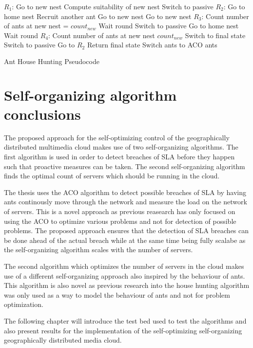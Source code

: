 \begin{algorithm}
\begin{algorithmic}
	\State $R_{1}$: Go to new nest
	\State Compute suitability of new nest
		Switch to passive
	\EndIf
	\State $R_{2}$: Go to home nest
		\State Recruit another ant
		\State Go to new nest
		\State Go to new nest
	\EndIf
	\State $R_{3}$: Count number of ants at new nest = $count_{new}$
		\State Wait round
		\State Switch to passive
		\State Go to home nest
		\State Wait round
	\EndIf
	\State $R_{4}$: Count number of ants at new nest $count_{new}$
		\State Switch to final state
		\State Switch to passive
		\State Go to $R_{2}$
	\EndIf
	\State Return final state
	\State Switch ants to ACO ants
\end{algorithmic}
\caption{Ant House Hunting Pseudocode}\label{ant:pseudocodeHouseHunting}
\end{algorithm}

\section{Self-organizing algorithm conclusions}

The proposed approach for the self-optimizing control of the geographically distributed multimedia cloud makes use of two self-organizing algorithms. The first algorithm is used in order to detect breaches of SLA before they happen such that proactive measures can be taken. The second self-organizing algorithm finds the optimal count of servers which should be running in the cloud.

The thesis uses the ACO algorithm to detect possible breaches of SLA by having ants continously move through the network and measure the load on the network of servers. This is a novel approach as previous reasearch has only focused on using the ACO to optimize various problems and not for detection of possible problems. The proposed approach ensures that the detection of SLA breaches can be done ahead of the actual breach while at the same time being fully scalabe as the self-organizing algorithm scales with the number of servers.

The second algorithm which optimizes the number of servers in the cloud makes use of a different self-organizing approach also inspired by the behaviour of ants. This algorithm is also novel as previous research into the house hunting algorithm was only used as a way to model the behaviour of ants and not for problem optimization.

The following chapter will introduce the test bed used to test the algorithms and also present results for the implementation of the self-optimizing self-organizing geographically distributed media cloud.